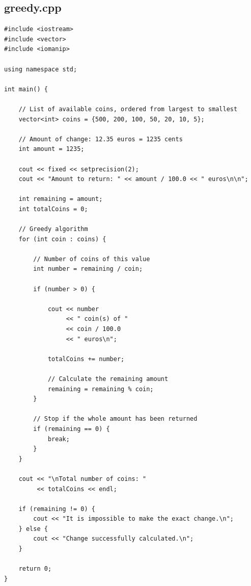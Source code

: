 \documentclass[11pt,a4paper]{article}
\begin{document}
\subsection{greedy.cpp}
\begin{lstlisting}
#include <iostream>
#include <vector>
#include <iomanip>

using namespace std;

int main() {

    // List of available coins, ordered from largest to smallest
    vector<int> coins = {500, 200, 100, 50, 20, 10, 5};

    // Amount of change: 12.35 euros = 1235 cents
    int amount = 1235;

    cout << fixed << setprecision(2);
    cout << "Amount to return: " << amount / 100.0 << " euros\n\n";

    int remaining = amount;
    int totalCoins = 0;

    // Greedy algorithm
    for (int coin : coins) {

        // Number of coins of this value
        int number = remaining / coin;

        if (number > 0) {

            cout << number
                 << " coin(s) of "
                 << coin / 100.0
                 << " euros\n";

            totalCoins += number;

            // Calculate the remaining amount
            remaining = remaining % coin;
        }

        // Stop if the whole amount has been returned
        if (remaining == 0) {
            break;
        }
    }

    cout << "\nTotal number of coins: "
         << totalCoins << endl;

    if (remaining != 0) {
        cout << "It is impossible to make the exact change.\n";
    } else {
        cout << "Change successfully calculated.\n";
    }

    return 0;
}
\end{lstlisting}
\end{document}
